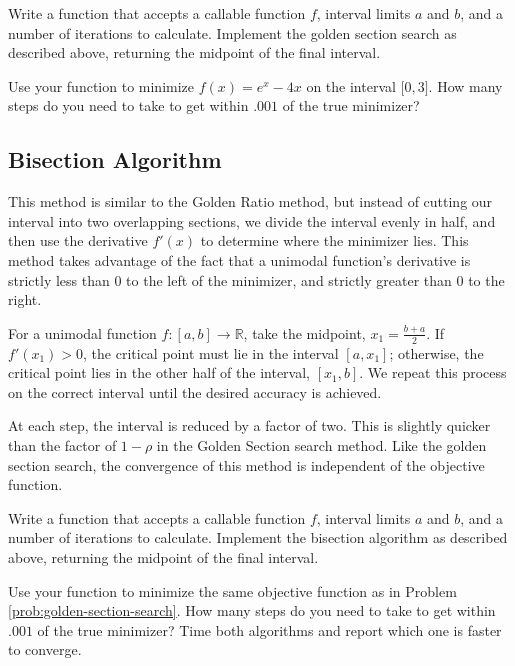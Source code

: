 \begin{problem} %
Write a function that accepts a callable function $f$, interval limits $a$ and $b$, and a number of iterations  to calculate.
Implement the golden section search as described above, returning the midpoint of the final interval.

Use your function to minimize $f(x) = e^x - 4x$ on the interval $\lbrack 0, 3 \rbrack$.
How many steps do you need to take to get within $.001$ of the true minimizer?
\label{prob:golden-section-search}
\end{problem}

\subsection*{Bisection Algorithm} %

This method is similar to the Golden Ratio method, but instead of cutting our interval into two overlapping sections, we divide the interval evenly in half, and then use the derivative $f'(x)$ to determine where the minimizer lies.
This method takes advantage of the fact that a unimodal function's derivative is strictly less than 0 to the left of the minimizer, and strictly greater than 0 to the right.

For a unimodal function $f:[a, b]\rightarrow\mathbb{R}$, take the midpoint, $x_1 = \frac{b + a}{2}$.
If $f'(x_1) > 0$, the critical point must lie in the interval $[a, x_1]$; otherwise, the critical point lies in the other half of the interval, $[x_1, b]$.
We repeat this process on the correct interval until the desired accuracy is achieved.

At each step, the interval is reduced by a factor of two.
This is slightly quicker than the factor of $1-\rho$ in the Golden Section search method.
Like the golden section search, the convergence of this method is independent of the objective function.

\begin{problem} %
Write a function that accepts a callable function $f$, interval limits $a$ and $b$, and a number of iterations  to calculate.
Implement the bisection algorithm as described above, returning the midpoint of the final interval.

Use your function to minimize the same objective function as in Problem \ref{prob:golden-section-search}.
How many steps do you need to take to get within $.001$ of the true minimizer?
Time both algorithms and report which one is faster to converge.
\end{problem}


